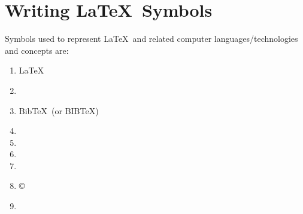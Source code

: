 









\section{Writing \LaTeX\ Symbols}
\label{sec:WritingLaTeXSymbols}


Symbols used to represent \LaTeX\ and related computer languages/technologies and concepts are: \vspace{-0.3cm}
\begin{enumerate} \itemsep -4pt
\item \LaTeX
\item \LaTeXe
\item {\sc Bib}\TeX\ (or B{\scriptsize IB}\TeX)
\item \MP
\item \MF
\item \texttrademark
\item \textregistered
\item \copyright
\item \textcopyleft
\end{enumerate}





